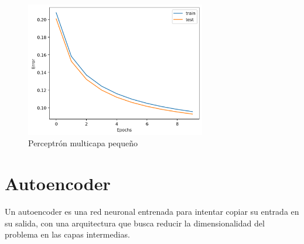 \documentclass[12pt,a4paper]{article}
\begin{document}
\begin{figure}[H]
    \includegraphics[width=0.7\textwidth]{img/21-training_error.png}
    \centering
    \caption*{Perceptrón multicapa pequeño}
\end{figure}

\section{Autoencoder}
Un autoencoder es una red neuronal entrenada para intentar copiar su entrada en su salida, con una arquitectura que busca reducir la dimensionalidad del problema en las capas intermedias.
\end{document}
